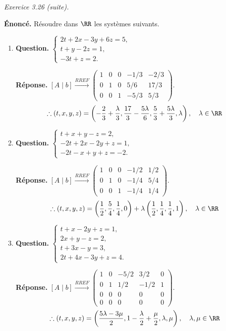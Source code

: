 \documentclass[12pt, a4paper]{article}
\begin{document}
\begin{enumerate}[label=3.\arabic*., start=25]
\begin{minipage}[t]{\linewidth}
\begin{enumerate}[label=\arabic*.,start=1]
\end{enumerate}
\end{minipage}
\par\medskip
\begin{minipage}[t]{\linewidth}\raggedright
\textit{Exercice 3.26 (suite).}\par\smallskip\textbf{Énoncé.} Résoudre dans $\RR$ les systèmes suivants.
\begin{enumerate}[label=\arabic*.,start=4]
\item \textbf{Question.} $\displaystyle\begin{cases}2t+2x-3y+6z=5,\\t+y-2z=1,\\-3t+z=2.\end{cases}$
\par\smallskip
\textbf{Réponse.} $\displaystyle [A\mid b]\xrightarrow{RREF}\begin{pmatrix}1&0&0&-1/3&-2/3\\0&1&0&5/6&17/3\\0&0&1&-5/3&5/3\end{pmatrix}$.
        \[
          \therefore(t,x,y,z)=\left(-\frac23+\frac\lambda3,\frac{17}3-\frac{5\lambda}6,
          \frac53+\frac{5\lambda}3,\lambda\right),\quad\lambda\in\RR
        \]

\item \textbf{Question.} $\displaystyle\begin{cases}t+x+y-z=2,\\-2t+2x-2y+z=1,\\-2t-x+y+z=-2.\end{cases}$
\par\smallskip
\textbf{Réponse.} $\displaystyle [A\mid b]\xrightarrow{RREF}\begin{pmatrix}1&0&0&-1/2&1/2\\0&1&0&-1/4&5/4\\0&0&1&-1/4&1/4\end{pmatrix}$.
        \[
          \therefore(t,x,y,z)=\left(\frac12,\frac54,\frac14,0\right)
          +\lambda\left(\frac12,\frac14,\frac14,1\right),\quad\lambda\in\RR
        \]

\item \textbf{Question.} $\displaystyle\begin{cases}t+x-2y+z=1,\\2x+y-z=2,\\t+3x-y=3,\\2t+4x-3y+z=4.\end{cases}$
\par\smallskip
\textbf{Réponse.} $\displaystyle [A\mid b]\xrightarrow{RREF}\begin{pmatrix}1&0&-5/2&3/2&0\\0&1&1/2&-1/2&1\\0&0&0&0&0\\0&0&0&0&0\end{pmatrix}$.
        \[
          \therefore(t,x,y,z)=\left(\frac{5\lambda-3\mu}2,1-\frac\lambda2+\frac\mu2,\lambda,\mu\right),
          \quad\lambda,\mu\in\RR
        \]


\end{enumerate}
\end{minipage}
\end{enumerate}
\end{document}
